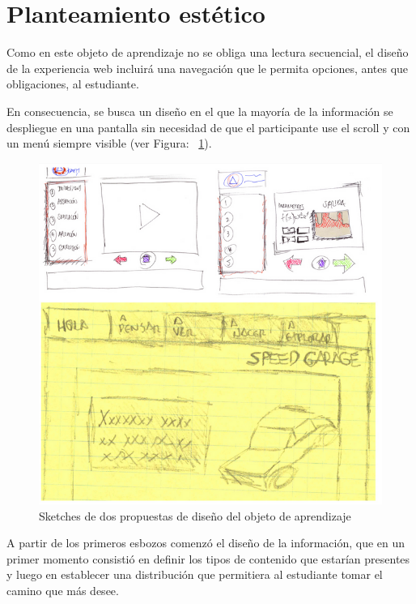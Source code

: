 \documentclass[twoside,letterpaper,12pt]{report}
\begin{document}

\section{Planteamiento estético} %
\label{sec:planteamiento_est_tico}

Como en este objeto de aprendizaje no se obliga una lectura secuencial, el diseño de la experiencia web incluirá una navegación que le permita opciones, antes que obligaciones, al estudiante.

En consecuencia, se busca un diseño en el que la mayoría de la información se despliegue en una pantalla sin necesidad de que el participante use el scroll y con un menú siempre visible (ver Figura: ~\ref{sketches}).

\begin{figure}[h!]
\label{sketches}
\includegraphics[width=1\textwidth]{aux/sketches}
\caption{Sketches de dos propuestas de diseño del objeto de aprendizaje}
\end{figure}


A partir de los primeros esbozos comenzó el diseño de la información, que en un primer momento consistió en definir los tipos de contenido que estarían presentes y luego en establecer una distribución que permitiera al estudiante tomar el camino que más desee.
\end{document}

